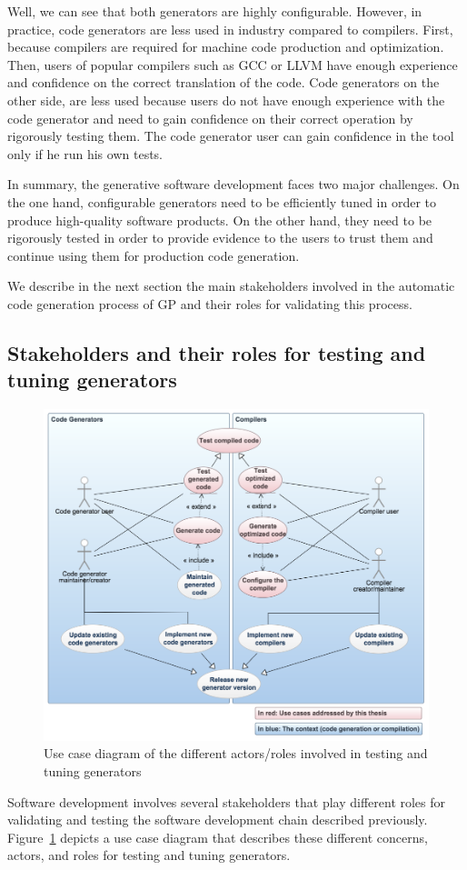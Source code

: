 Well, we can see that both generators are highly configurable. However, in practice, code generators are less used in industry compared to compilers. First, because compilers are required for machine code production and optimization. Then, users of popular compilers such as GCC or LLVM have enough experience and confidence on the correct translation of the code. 
Code generators on the other side, are less used because users do not have enough experience with the code generator and need to gain confidence on their correct operation by rigorously testing them. The code generator user can gain confidence in the tool only if he run his own tests.

In summary, the generative software development faces two major challenges. On the one hand, configurable generators need to be efficiently tuned in order to produce high-quality software products. On the other hand, they need to be rigorously tested in order to provide evidence to the users to trust them and continue using them for production code generation.

We describe in the next section the main stakeholders involved in the automatic code generation process of GP and their roles for validating this process.


\subsection{Stakeholders and their roles for testing and tuning generators}
\begin{figure}[h]
	\center
	\includegraphics[scale=0.45]{Background/fig/usecase}
	\caption{Use case diagram of the different actors/roles involved in testing and tuning generators}
	\label{fig:usecase}
\end{figure}
Software development involves several stakeholders that play different roles for validating and testing the software development chain described previously.
Figure~\ref{fig:usecase} depicts a use case diagram that describes these different concerns, actors, and roles for testing and tuning generators.

